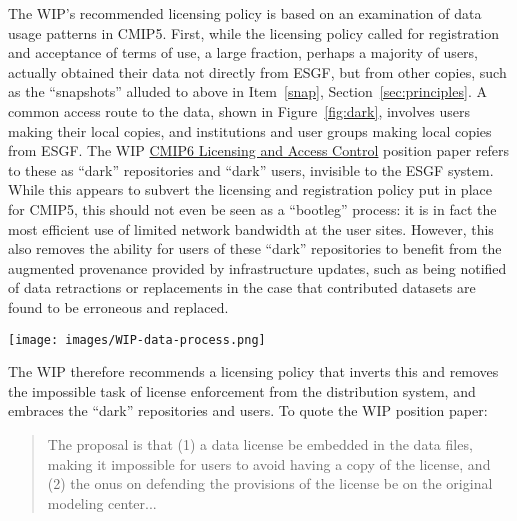 \documentclass[gmd,manuscript]{copernicus}
\newcommand{\figref}[1] {\mbox{Figure   \ref{fig:#1}}}
\newcommand{\secref}[1] {\mbox{Section  \ref{sec:#1}}}
\begin{document}
The WIP's recommended licensing policy is based on an examination of
data usage patterns in CMIP5. First, while the licensing policy called
for registration and acceptance of terms of use, a large fraction,
perhaps a majority of users, actually obtained their data not directly
from ESGF, but from other copies, such as the ``snapshots'' alluded to
above in Item~\ref{snap}, \secref{principles}. 
A common access route to the data, shown in \figref{dark}, involves
users making their local copies, and institutions and user groups
making local copies from ESGF. The WIP
\href{https://goo.gl/7vHsPU}{CMIP6 Licensing and Access Control}
position paper refers to these as ``dark'' repositories and ``dark''
users, invisible to the ESGF system. While this appears to subvert the
licensing and registration policy put in place for CMIP5, this should
not even be seen as a ``bootleg'' process: it is in fact the most
efficient use of limited network bandwidth at the user sites. However, 
this also removes the ability for users of these ``dark'' repositories 
to benefit from the augmented provenance provided by infrastructure 
updates, such as being notified of data retractions or replacements 
in the case that contributed datasets are found to be erroneous and 
replaced.

\begin{figure*}
  \begin{center}
    \texttt{[image: images/WIP-data-process.png]}
  \end{center}
  \caption{Typical data usage pattern in CMIP5 involved users making
    local copies, and user groups making institutional-scale caches
    from ESGF. Figure courtesy Stephan Kindermann, DKRZ, adapted from
    WIP Licensing White Paper.}
  \label{fig:dark}
\end{figure*}

The WIP therefore recommends a licensing policy that inverts this and
removes the impossible task of license enforcement from the distribution 
system, and embraces the ``dark'' repositories and users.
To quote the WIP position paper:

\begin{quote}
  The proposal is that (1) a data license be embedded in the data
  files, making it impossible for users to avoid having a copy of the
  license, and (2) the onus on defending the provisions of the license
  be on the original modeling center...
\end{quote}
\end{document}

